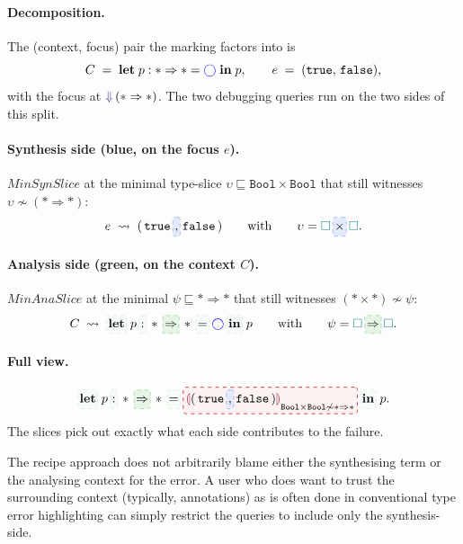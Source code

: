 \paragraph{Decomposition.}
The (context, focus) pair the marking factors into is
\[
  C \;=\; \mathbf{let}\;p : * \Rightarrow * = {\color{blue}\bigcirc}\;\mathbf{in}\;p,
  \qquad
  e \;=\; (\texttt{true},\,\texttt{false}),
\]
with the focus at ${\color{BlueViolet}\Downarrow}\,(* \Rightarrow *)$. The two
debugging queries run on the two sides of this split.

\paragraph{Synthesis side (blue, on the focus $e$).}
$\mathit{MinSynSlice}$ at the minimal type-slice $\upsilon \sqsubseteq \texttt{Bool} \times \texttt{Bool}$ that still witnesses $\upsilon \not\sim (* \Rightarrow *)$:
\[
  e \;\rightsquigarrow\; (\,\texttt{true}\,\sli{,}\,\texttt{false}\,)
  \qquad\text{with}\qquad
  \upsilon = \gap\,\sli{\times}\,\gap.
\]

\paragraph{Analysis side (green, on the context $C$).}
$\mathit{MinAnaSlice}$ at the minimal $\psi \sqsubseteq * \Rightarrow *$ that still witnesses $(* \times *) \not\sim \psi$:
\[
  C \;\rightsquigarrow\;
  \slist{\mathbf{let}}\;p\,\slist{:}\,*\,\sli[OliveGreen]{\Rightarrow}\,*\,\slist{=}\,\cmark\,\slist{\mathbf{in}}\;p
  \qquad\text{with}\qquad
  \psi = \gap\,\sli[OliveGreen]{\Rightarrow}\,\gap.
\]

\paragraph{Full view.}
\[
  \slist{\mathbf{let}}\;p\,\slist{:}\,*\,\sli[OliveGreen]{\Rightarrow}\,*\,\slist{=}\,
  \markbox{\markincon[(\,\texttt{true}\,\sli{,}\,\texttt{false}\,)]{\texttt{Bool} \times \texttt{Bool}}{* \Rightarrow *}}\,
  \slist{\mathbf{in}}\;p.
\]
The slices pick out exactly what each side contributes to the failure.

The recipe approach does not arbitrarily blame either the synthesising term or the analysing context for the error. A user who does want to trust the surrounding context (typically, annotations) as is often done in conventional type error highlighting can simply restrict the queries to include only the synthesis-side.

